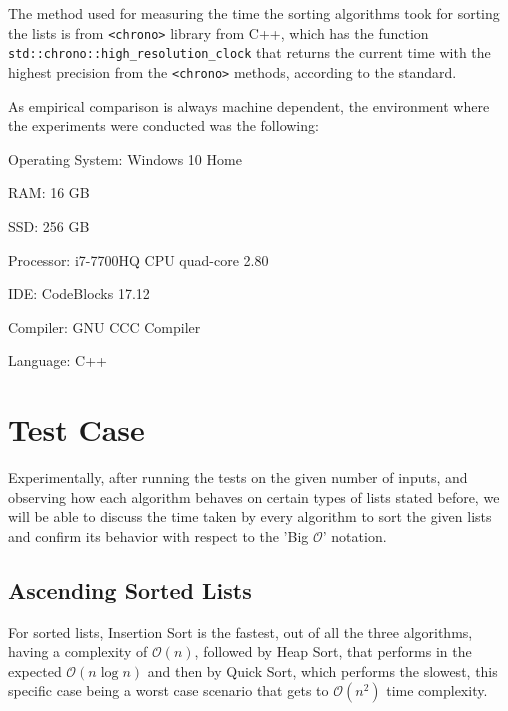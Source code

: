 \documentclass[]{article}
\begin{document}
The method used for measuring the time the sorting algorithms took for sorting the lists is from \lstinline!<chrono>! library from C++, which has the function
\lstinline!std::chrono::high_resolution_clock! that returns the current time with the highest precision from the \lstinline!<chrono>! methods, according to the standard. 

\noindent As empirical comparison is always machine dependent, the environment where the experiments were conducted was the following: 

	Operating System: Windows 10 Home
	
	RAM: 16 GB
	
	SSD: 256 GB 
	
	Processor: i7-7700HQ CPU quad-core 2.80
	
	IDE: CodeBlocks 17.12 
	
	Compiler: GNU CCC Compiler
	
	Language: C++


	\pagebreak
		
	\section{Test Case}
Experimentally, after running the tests on the given number of inputs, and observing how each algorithm behaves on certain types of lists stated before, we will be able to discuss the time taken by every algorithm to sort the given lists and confirm its behavior with respect to the 'Big $\mathcal{O}$' notation.

	\subsection{Ascending Sorted Lists}	
For sorted lists, Insertion Sort is the fastest, out of all the three algorithms, having a complexity of $\mathcal{O}(n)$, followed by Heap Sort, that performs in the expected $\mathcal{O}(n\log{}n)$ and then by Quick Sort, which performs the slowest, this specific case being a worst case scenario that gets to $\mathcal{O}(n^2)$ time complexity.
\end{document}
